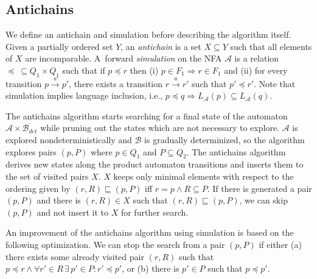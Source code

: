 \documentclass{eeict}
\begin{document}
\subsection{Antichains}
We define an antichain and simulation before describing the algorithm itself. 
Given a partially ordered set $Y$, an \emph {antichain} is a set $X \subseteq Y$ such that all elements of $X$ are incomparable.
A~forward \emph{simulation} on the NFA $\mathcal{A}$ is a relation $\preceq\  \subseteq Q_1 \times Q_1$ 
such that if $p \preceq r$ then (i) $p \in F_1 
\Rightarrow r \in F_1$ and (ii) for every transition $p\xrightarrow{a}p'$, there exists a transition 
$r\xrightarrow{a}r'$ such that $p' \preceq r'$. Note that simulation implies language inclusion, i.e., $p\preceq q \Rightarrow L_\mathcal{A}(p)
\subseteq L_\mathcal{A}(q)$.

The antichains algorithm \cite{cav06} starts searching for a final state of the automaton $\mathcal{A}\times \overline{\mathcal{B}_{det}}$ while
pruning out the states which are not necessary to explore. $\mathcal{A}$ is explored nondeterministically and $\mathcal{B}$ 
is gradually determinized, so the algorithm explores pairs $(p,P)$ where $p\in Q_1$ and $P\subseteq Q_2$. 
The antichains algorithm derives new states along the product automaton transitions and inserts them to the set of visited pairs $X$.
$X$ keeps only minimal elements with respect to the ordering given by $(r,R)\sqsubseteq (p,P)$ iff $r=p \wedge R \subseteq P$. 
If there is generated a pair $(p,P)$ and there is 
$(r,R)\in X$ such that $(r,R) \sqsubseteq (p,P)$, we can skip $(p,P)$ and not insert it to $X$ for further search.
 
An improvement of the antichains algorithm using simulation \cite{tacas10} is based on the following optimization. 
We can stop the search from a pair $(p,P)$ if either (a) there exists some already visited pair $(r,R)$ 
such that $p\preceq r \wedge \forall r'\in R\, \exists\, p' \in P: r' \preceq p'$, or (b) there is $p' \in P$ such that $p \preceq p'$.
\end{document}
